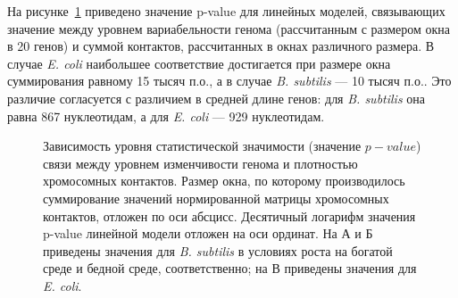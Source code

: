  На рисунке~\ref{img:hic_coli_subtilis} приведено значение p-value для линейных моделей, связывающих значение между уровнем вариабельности генома (рассчитанным с размером окна в 20 генов) и суммой контактов, рассчитанных в окнах различного размера. В случае  \textit{E. coli} наибольшее соответствие достигается при размере окна суммирования равному 15 тысяч п.о., а в случае \textit{B. subtilis} --- 10 тысяч п.о.. Это различие согласуется с различием в средней длине генов: для \textit{B. subtilis} она равна 867 нуклеотидам, а для \textit{E. coli} --- 929 нуклеотидам.

\begin{figure}[!ht] 
  \center
  \hfill
  \hfill

  \caption{Зависимость уровня статистической значимости (значение $p-value$) связи между уровнем изменчивости генома и плотностью хромосомных контактов. Размер окна, по которому производилось суммирование значений нормированной матрицы хромосомных контактов, отложен по оси абсцисс. Десятичный логарифм значения p-value линейной модели отложен на оси ординат. На А и Б приведены значения для \textit{B. subtilis} в условиях роста на богатой среде и бедной среде, соответственно; на В приведены значения для \textit{E. coli}.} 
  \label{img:hic_coli_subtilis}  
\end{figure}

